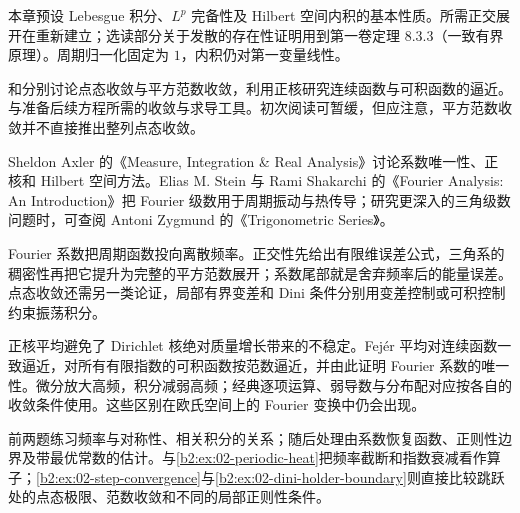 \ProseParagraphBreak

本章预设 Lebesgue 积分、\(L^p\) 完备性及 Hilbert 空间内积的基本性质。所需正交展开在重新建立；选读部分关于发散的存在性证明用到第一卷定理 8.3.3（一致有界原理）。周期归一化固定为 \(1\)，内积仍对第一变量线性。

\ProseParagraphBreak

和分别讨论点态收敛与平方范数收敛，利用正核研究连续函数与可积函数的逼近。与准备后续方程所需的收敛与求导工具。初次阅读可暂缓，但应注意，平方范数收敛并不直接推出整列点态收敛。

\ProseParagraphBreak

Sheldon Axler 的《Measure, Integration \& Real Analysis》\cite[Sections 11A--11B]{Axler2020Measure}讨论系数唯一性、正核和 Hilbert 空间方法。Elias M. Stein 与 Rami Shakarchi 的《Fourier Analysis: An Introduction》\cite{Stein2003Fourier}把 Fourier 级数用于周期振动与热传导；研究更深入的三角级数问题时，可查阅 Antoni Zygmund 的《Trigonometric Series》\cite{Zygmund2002Trigonometric}。









\begin{chaptersummary}
Fourier 系数把周期函数投向离散频率。正交性先给出有限维误差公式，三角系的稠密性再把它提升为完整的平方范数展开；系数尾部就是舍弃频率后的能量误差。点态收敛还需另一类论证，局部有界变差和 Dini 条件分别用变差控制或可积控制约束振荡积分。

\ProseParagraphBreak

正核平均避免了 Dirichlet 核绝对质量增长带来的不稳定。Fejér 平均对连续函数一致逼近，对所有有限指数的可积函数按范数逼近，并由此证明 Fourier 系数的唯一性。微分放大高频，积分减弱高频；经典逐项运算、弱导数与分布配对应按各自的收敛条件使用。这些区别在欧氏空间上的 Fourier 变换中仍会出现。
\end{chaptersummary}

\BookExercises

前两题练习频率与对称性、相关积分的关系；随后处理由系数恢复函数、正则性边界及带最优常数的估计。与\cref{b2:ex:02-periodic-heat}把频率截断和指数衰减看作算子；\cref{b2:ex:02-step-convergence}与\cref{b2:ex:02-dini-holder-boundary}则直接比较跳跃处的点态极限、范数收敛和不同的局部正则性条件。


